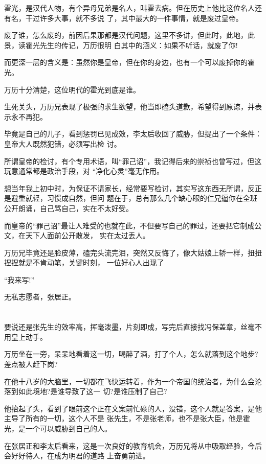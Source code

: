 \documentclass[11pt,a4paper,onecolumn]{article}
\begin{document}
霍光，是汉代人物，有个异母兄弟是名人，叫霍去病。但在历史上他比这位名人还有名，干过许多大事，就不多说
了，其中最大的一件事情，就是废过皇帝。

废了谁，怎么废的，前因后果那都是汉代问题，这里不多讲，但此时，此地，此景，读霍光先生的传记，万历很明
白其中的涵义：如果不听话，就废了你!

而更深一层的含义是：虽然你是皇帝，但在你的身边，也有一个可以废掉你的霍光。

万历十分清楚，这位明代的霍光到底是谁。

生死关头，万历兄表现了极强的求生欲望，他当即磕头道歉，希望得到原谅，并表示永不再犯。

毕竟是自己的儿子，看到惩罚已见成效，李太后收回了威胁，但提出了一个条件：皇帝大人既然犯错，必须写出检
讨。

所谓皇帝的检讨，有个专用术语，叫``罪己诏''，我记得后来的崇祯也曾写过，但这玩意通常都是政治手段，对
``净化心灵''毫无作用。

想当年我上初中时，为保证不请家长，经常要写检讨，其实写这东西无所谓，反正是避重就轻，习惯成自然，但问
题在于，总有那么几个缺心眼的仁兄逼你在全班公开朗诵，自己骂自己，实在不太好受。

而皇帝的``罪己诏''最让人难受的也就在此，不但要写自己的罪过，还要把它制成公文，在天下人面前公开散发，
实在太过丢人。

万历兄毕竟还是脸皮薄，磕完头流完泪，突然又反悔了，像大姑娘上轿一样，扭扭捏捏就是不肯动笔，关键时刻，
一位好心人出现了

``我来写!''

无私志愿者，张居正。

\section[\thesection]{}

要说还是张先生的效率高，挥毫泼墨，片刻即成，写完后直接找冯保盖章，丝毫不用皇上动手。

万历坐在一旁，呆呆地看着这一切，喝醉了酒，打了个人，怎么就落到这个地步?差点被人赶下岗?

在他十八岁的大脑里，一切都在飞快运转着，作为一个帝国的统治者，为什么会沦落到如此境地?是谁导致了这一
切?是谁压制了自己?

他抬起了头，看到了眼前这个正在文案前忙碌的人，没错，这个人就是答案，是他主导了所有的一切，这个人不是
张先生，不是张老师，也不是张大臣，他是霍光，是一个可以威胁到自己的人。

在张居正和李太后看来，这是一次良好的教育机会，万历兄将从中吸取经验，今后会好好待人，在成为明君的道路
上奋勇前进。
\end{document}
